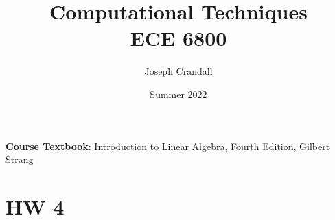
\usepackage{algorithm, algpseudocode, bm, color, gensymb, listings, siunitx, soul, subfiles, verbatim}
\usepackage[a4paper, total={7.5in, 10in}]{geometry}

\title{Computational Techniques\\
\large ECE 6800}
\author{Joseph Crandall}
\date{Summer 2022}


\maketitle

\textbf{Course Textbook}: Introduction to Linear Algebra, Fourth Edition, Gilbert Strang

\begin{comment}

\section{Lecture 1}


\section{Hw 1}


\section{Lecture 2}


\section{Hw 2}


\section{Lecture 3}


\section{HW 3}


\section{Lecture 4}


\end{comment}

\section{HW 4}


\begin{comment}

\section{Midterm}


\end{comment}

